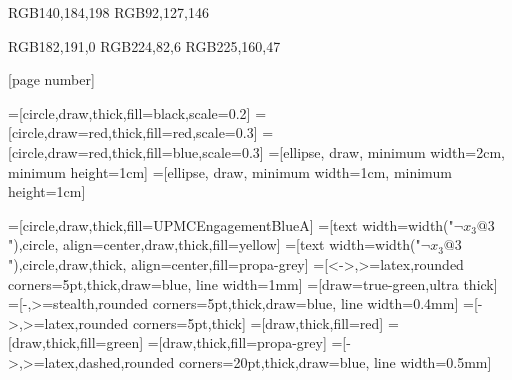

\definecolor{UPMCEngagementBlueA} {RGB}{140,184,198}
\definecolor{UPMCEngagementBlueB} {RGB}{92,127,146}

\definecolor{UPMCCorporateGreen} {RGB}{182,191,0}
\definecolor{UPMCExcellenceOrangeA} {RGB}{224,82,6}
\definecolor{UPMCExcellenceOrangeB} {RGB}{225,160,47}

 {
  [page number]{}
  \beamertemplatenavigationsymbolsempty
}


=[circle,draw,thick,fill=black,scale=0.2]
=[circle,draw=red,thick,fill=red,scale=0.3]
=[circle,draw=red,thick,fill=blue,scale=0.3]
=[ellipse, draw, minimum width=2cm, minimum height=1cm]
=[ellipse, draw, minimum width=1cm, minimum height=1cm]

=[circle,draw,thick,fill=UPMCEngagementBlueA]
=[text width={width("$\neg x_3@3$")},circle,
align=center,draw,thick,fill=yellow]
=[text width={width("$\neg x_3@3$")},circle,draw,thick,
align=center,fill=propa-grey]
=[<->,>=latex,rounded corners=5pt,thick,draw=blue, line width=1mm]
=[draw=true-green,ultra thick]
=[-,>=stealth,rounded corners=5pt,thick,draw=blue, line width=0.4mm]
=[->,>=latex,rounded corners=5pt,thick]
=[draw,thick,fill=red]
=[draw,thick,fill=green]
=[draw,thick,fill=propa-grey]
=[->,>=latex,dashed,rounded corners=20pt,thick,draw=blue, line width=0.5mm]

